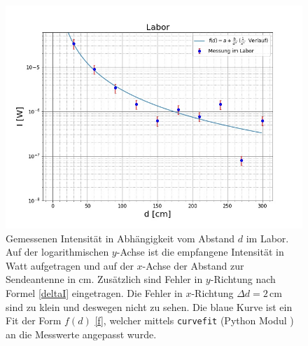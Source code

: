 \documentclass[titlepage,11pt,a4paper,ngerman]{article}
\begin{document}
\begin{figure}[ht]
	\includegraphics[scale=0.55]{Bilder/Abstand-Labor.jpg}
	\centering
	\caption{Gemessenen Intensität in Abhängigkeit vom Abstand $d$ im Labor. Auf der logarithmischen $y$-Achse ist die empfangene Intensität in Watt aufgetragen und auf der $x$-Achse der Abstand zur Sendeantenne in cm. Zusätzlich sind Fehler in $y$-Richtung nach Formel \eqref{deltaI} eingetragen. Die Fehler in $x$-Richtung $\Delta d = 2\,$cm sind zu klein und deswegen nicht zu sehen. Die blaue Kurve ist ein Fit der Form $f(d)$ \eqref{f}, welcher mittels \texttt{curvefit} (Python Modul \cite{curvescipy}) an die Messwerte angepasst wurde.}
	\label{Labor-A}
\end{figure}
\end{document}
